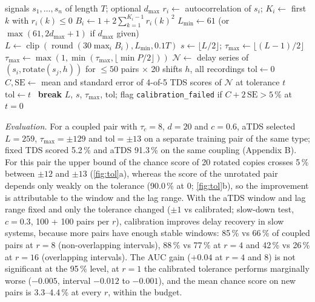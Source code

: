 \documentclass[11pt,a4paper]{article}
\begin{document}
\begin{algorithm}[t]
\caption{aTDS parameter selection}
\label{alg:atds}
\begin{algorithmic}[1]
\Require signals $s_1,\dots,s_n$ of length $T$; optional $d_{\max}$
  \State $r_i \gets$ autocorrelation of $s_i$; \quad $K_i \gets$ first $k$ with $r_i(k)\le 0$
  \State $B_i \gets 1 + 2\sum_{k=1}^{K_i-1} r_i(k)^2$
\EndFor
\State $L_{\min} \gets 61$ (or $\max(61, 2d_{\max}+1)$ if $d_{\max}$ given)
\State $L \gets \operatorname{clip}(\operatorname{round}(30\max_i B_i), L_{\min}, 0.1T)$ 
\State $s \gets \lfloor L/2\rfloor$; \quad $\tau_{\max} \gets \lfloor (L-1)/2 \rfloor$
 $\tau_{\max} \gets \max(1, \min(\tau_{\max}, \lfloor\min P/2\rfloor))$ \EndIf
\State $\mathcal{N} \gets$ delay series of $(s_i, \mathrm{rotate}(s_j, h))$ for $\le 50$ pairs $\times$ 20 shifts $h$, all recordings
\State $\mathrm{tol} \gets 0$
  \State $C, \mathrm{SE} \gets$ mean and standard error of 4-of-5 TDS scores of $\mathcal{N}$ at tolerance $t$
   $\mathrm{tol} \gets t$ \Else\ \textbf{break} \EndIf
\EndFor
\State \Return $L$, $s$, $\tau_{\max}$, $\mathrm{tol}$; flag \texttt{calibration\_failed} if $C + 2\,\mathrm{SE} > 5\,\%$ at $t=0$
\end{algorithmic}
\end{algorithm}

\label{sec:res-tol}
\label{sec:example}
\emph{Evaluation.} For a coupled pair with $\tau_c = 8$, $d = 20$ and $c = 0.6$, aTDS selected $L = 259$, $\tau_{\max} = \pm129$ and $\mathrm{tol} = \pm13$ on a separate training pair of the same type; fixed TDS scored 5.2\,\% and aTDS 91.3\,\% on the same coupling (Appendix B). For this pair the upper bound of the chance score of 20 rotated copies crosses 5\,\% between $\pm12$ and $\pm13$ (\cref{fig:tol}a), whereas the score of the unrotated pair depends only weakly on the tolerance (90.0\,\% at 0; \cref{fig:tol}b), so the improvement is attributable to the window and the lag range. With the aTDS window and lag range fixed and only the tolerance changed ($\pm1$ vs calibrated; slow-down test, $c = 0.3$, 100 + 100 pairs per $r$), calibration improves delay recovery in slow systems, because more pairs have enough stable windows: 85\,\% vs 66\,\% of coupled pairs at $r = 8$ (non-overlapping intervals), 88\,\% vs 77\,\% at $r = 4$ and 42\,\% vs 26\,\% at $r = 16$ (overlapping intervals). The AUC gain ($+0.04$ at $r = 4$ and 8) is not significant at the 95\,\% level, at $r = 1$ the calibrated tolerance performs marginally worse ($-0.005$, interval $-0.012$ to $-0.001$), and the mean chance score on new pairs is 3.3--4.4\,\% at every $r$, within the budget.
\end{document}
